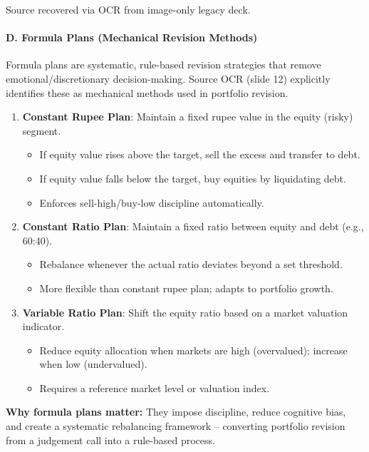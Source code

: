 \documentclass[
]{article}
\begin{document}
Source recovered via OCR from image-only legacy deck.

\hypertarget{formula-plans}{%
\paragraph{D. Formula Plans (Mechanical Revision Methods)}\label{formula-plans}}

Formula plans are systematic, rule-based revision strategies that remove emotional/discretionary decision-making. Source OCR (slide 12) explicitly identifies these as mechanical methods used in portfolio revision.

\begin{enumerate}
\item \textbf{Constant Rupee Plan}: Maintain a fixed rupee value in the equity (risky) segment.
  \begin{itemize}
    \item If equity value rises above the target, sell the excess and transfer to debt.
    \item If equity value falls below the target, buy equities by liquidating debt.
    \item Enforces sell-high/buy-low discipline automatically.
  \end{itemize}
\item \textbf{Constant Ratio Plan}: Maintain a fixed ratio between equity and debt (e.g., 60:40).
  \begin{itemize}
    \item Rebalance whenever the actual ratio deviates beyond a set threshold.
    \item More flexible than constant rupee plan; adapts to portfolio growth.
  \end{itemize}
\item \textbf{Variable Ratio Plan}: Shift the equity ratio based on a market valuation indicator.
  \begin{itemize}
    \item Reduce equity allocation when markets are high (overvalued); increase when low (undervalued).
    \item Requires a reference market level or valuation index.
  \end{itemize}
\end{enumerate}

\textbf{Why formula plans matter:} They impose discipline, reduce cognitive bias, and create a systematic rebalancing framework -- converting portfolio revision from a judgement call into a rule-based process.
\end{document}
